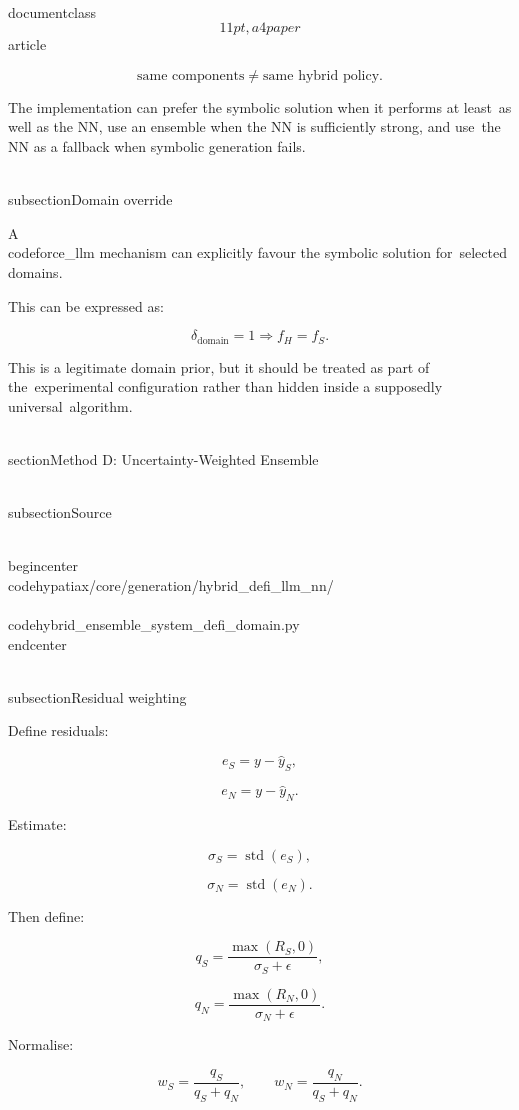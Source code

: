 \\documentclass\[11pt,a4paper\]{article}
\begin{document}
 $$
\boxed{
\text{same components}
\neq
\text{same hybrid policy}.
}
$$

 The implementation can prefer the symbolic solution when it performs at least\
 as well as the NN, use an ensemble when the NN is sufficiently strong, and use\
 the NN as a fallback when symbolic generation fails.

 \\subsection{Domain override}

 A \\code{force\_llm} mechanism can explicitly favour the symbolic solution for\
 selected domains.

 This can be expressed as:

 $$
\delta_{\mathrm{domain}}=1
\Rightarrow
f_H=f_S.
$$

 This is a legitimate domain prior, but it should be treated as part of the\
 experimental configuration rather than hidden inside a supposedly universal\
 algorithm.

 \\section{Method D: Uncertainty-Weighted Ensemble}\

 \\subsection{Source}

 \\begin{center}\
 \\code{hypatiax/core/generation/hybrid\_defi\_llm\_nn/}\\\
 \\code{hybrid\_ensemble\_system\_defi\_domain.py}\
 \\end{center}

 \\subsection{Residual weighting}

 Define residuals:

 $$
e_S=y-\hat y_S,
$$

 $$
e_N=y-\hat y_N.
$$

 Estimate:

 $$
\sigma_S=\operatorname{std}(e_S),
$$

 $$
\sigma_N=\operatorname{std}(e_N).
$$

 Then define:

 $$
q_S=
\frac{\max(R_S,0)}
{\sigma_S+\epsilon},
$$

 $$
q_N=
\frac{\max(R_N,0)}
{\sigma_N+\epsilon}.
$$

 Normalise:

 $$
w_S=\frac{q_S}{q_S+q_N},
\qquad
w_N=\frac{q_N}{q_S+q_N}.
$$
\end{document}
